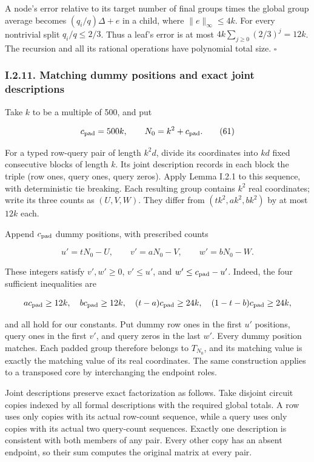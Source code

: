 A node's error relative to its target number of final groups times the global group average becomes \((q_i/q)\Delta+e\) in a child, where \(\|e\|_\infty\le4k\). For every nontrivial split \(q_i/q\le2/3\). Thus a leaf's error is at most \(4k\sum_{j\ge0}(2/3)^j=12k\). The recursion and all its rational operations have polynomial total size. \(\square\)

\hypertarget{af-a9ec399514-i.2.11.-matching-dummy-positions-and-exact-joint-descriptions}{%
\subsubsection{I.2.11. Matching dummy positions and exact joint descriptions}\label{af-a9ec399514-i.2.11.-matching-dummy-positions-and-exact-joint-descriptions}}

Take \(k\) to be a multiple of 500, and put

\[
c_{\rm pad}=500k,\qquad N_0=k^2+c_{\rm pad}.
\tag{61}
\]

For a typed row-query pair of length \(k^2d\), divide its coordinates into \(kd\) fixed consecutive blocks of length \(k\). Its joint description records in each block the triple (row ones, query ones, query zeros). Apply Lemma I.2.1 to this sequence, with deterministic tie breaking. Each resulting group contains \(k^2\) real coordinates; write its three counts as \((U,V,W)\). They differ from \((tk^2,ak^2,bk^2)\) by at most \(12k\) each.

Append \(c_{\rm pad}\) dummy positions, with prescribed counts

\[
u'=tN_0-U,\qquad v'=aN_0-V,\qquad w'=bN_0-W.
\tag{62}
\]

These integers satisfy \(v',w'\ge0\), \(v'\le u'\), and \(w'\le c_{\rm pad}-u'\). Indeed, the four sufficient inequalities are

\[
ac_{\rm pad}\ge12k,\quad bc_{\rm pad}\ge12k,\quad
(t-a)c_{\rm pad}\ge24k,\quad
(1-t-b)c_{\rm pad}\ge24k,
\]

and all hold for our constants. Put dummy row ones in the first \(u'\) positions, query ones in the first \(v'\), and query zeros in the last \(w'\). Every dummy position matches. Each padded group therefore belongs to \(T_{N_0}\), and its matching value is exactly the matching value of its real coordinates. The same construction applies to a transposed core by interchanging the endpoint roles.

Joint descriptions preserve exact factorization as follows. Take disjoint circuit copies indexed by all formal descriptions with the required global totals. A row uses only copies with its actual row-count sequence, while a query uses only copies with its actual two query-count sequences. Exactly one description is consistent with both members of any pair. Every other copy has an absent endpoint, so their sum computes the original matrix at every pair.

